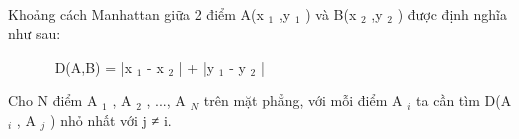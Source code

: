  

Khoảng cách Manhattan giữa 2 điểm A(x $_ 1 $ ,y $_ 1 $ ) và B(x $_ 2 $ ,y $_ 2 $ ) được định nghĩa như sau:

        D(A,B) = |x $_ 1 $ - x $_ 2 $ | + |y $_ 1 $ - y $_ 2 $ |

Cho N điểm A $_ 1 $ , A $_ 2 $ , ..., A $_ N $ trên mặt phẳng, với mỗi điểm A $_ i $ ta cần tìm D(A $_ i $ , A $_ j $ ) nhỏ nhất với j ≠ i.